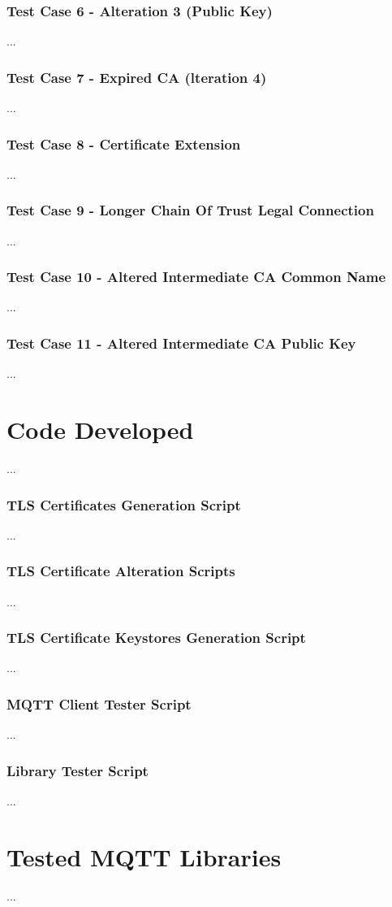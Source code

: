 \documentclass[binding=0.6cm,noexaminfo]{sapthesis}
\begin{document}
\subsection{Test Case 6 - Alteration 3 (Public Key)} ...
\subsection{Test Case 7 - Expired CA (lteration 4)} ...
\subsection{Test Case 8 - Certificate Extension} ...
\subsection{Test Case 9 - Longer Chain Of Trust Legal Connection} ...
\subsection{Test Case 10 - Altered Intermediate CA Common Name} ...
\subsection{Test Case 11 - Altered Intermediate CA Public Key} ...
\chapter{Code Developed} ...
\subsection{TLS Certificates Generation Script} ...
\subsection{TLS Certificate Alteration Scripts} ...
\subsection{TLS Certificate Keystores Generation Script} ...
\subsection{MQTT Client Tester Script} ...
\subsection{Library Tester Script} ...
\chapter{Tested MQTT Libraries} ...
\end{document}
